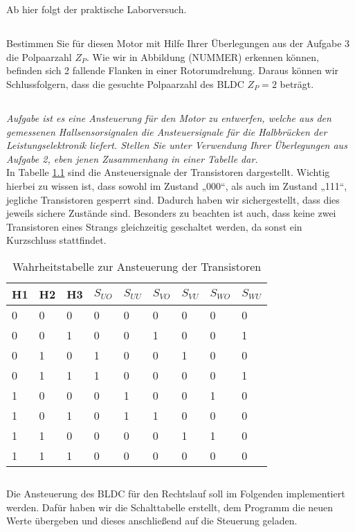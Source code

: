 \chapter{}\label{ch:auf4}
Ab hier folgt der praktische Laborversuch.

\section{}\label{sec:4a}
Bestimmen Sie für diesen Motor mit Hilfe Ihrer Überlegungen aus der Aufgabe 3 die Polpaarzahl $ Z_{P} $.
Wie wir in Abbildung (NUMMER) erkennen können, befinden sich 2 fallende Flanken in einer Rotorumdrehung. Daraus können wir Schlussfolgern, dass die gesuchte Polpaarzahl des BLDC $ Z_{P} = 2  $ beträgt.

\section{}\label{sec:4b}
\textit{Aufgabe ist es eine Ansteuerung für den Motor zu entwerfen, welche aus den gemessenen Hallsensorsignalen die Ansteuersignale für die Halbbrücken der Leistungselektronik liefert. Stellen Sie unter Verwendung Ihrer Überlegungen aus Aufgabe 2, eben jenen Zusammenhang in einer Tabelle dar.}\\
In Tabelle \ref{tab:4b:werte} sind die Ansteuersignale der Transistoren dargestellt. Wichtig hierbei zu wissen ist, dass sowohl im Zustand „000“, als auch im Zustand „111“, jegliche Transistoren gesperrt sind. Dadurch haben wir sichergestellt, dass dies jeweils sichere Zustände sind. Besonders zu beachten ist auch, dass keine zwei Transistoren eines Strangs gleichzeitig geschaltet werden, da sonst ein Kurzschluss stattfindet.\\
\begin{table}[h]
	\centering
	\begin{tabular}{p{1cm} p{1cm} p{1cm} | p{1cm} p{1cm} p{1cm} p{1cm} p{1cm} p{1cm}}
		\centering
		H1 & H2 & H3 & $ S_{UO} $ & $ S_{UU} $ & $ S_{VO} $ & $ S_{VU} $ & $ S_{WO} $ & $ S_{WU} $ \\
		\hline
		  0 &  0 &  0 &   0 &   0 &   0 &   0 &   0 &   0 \\
		  0 &  0 &  1 &   0 &   0 &   1 &   0 &   0 &   1 \\
		  0 &  1 &  0 &   1 &   0 &   0 &   1 &   0 &   0 \\
		  0 &  1 &  1 &   1 &   0 &   0 &   0 &   0 &   1 \\
		  1 &  0 &  0 &   0 &   1 &   0 &   0 &   1 &   0 \\
		  1 &  0 &  1 &   0 &   1 &   1 &   0 &   0 &   0 \\
		  1 &  1 &  0 &   0 &   0 &   0 &   1 &   1 &   0 \\
		  1 &  1 &  1 &   0 &   0 &   0 &   0 &   0 &   0 \\
	\end{tabular}
	\caption{Wahrheitstabelle zur Ansteuerung der Transistoren}
	\label{tab:4b:werte}
\end{table}

\section{}\label{sec:4c}
Die Ansteuerung des BLDC für den Rechtslauf soll im Folgenden implementiert werden. Dafür haben wir die Schalttabelle erstellt, dem Programm die neuen Werte übergeben und dieses anschließend auf die Steuerung geladen.
